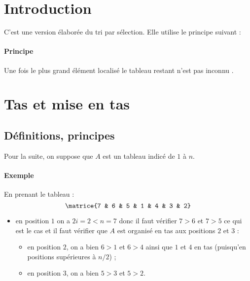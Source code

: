 \documentclass{mybourbaki}
\begin{document}
\section*{Introduction}
C'est une version élaborée du tri par sélection. Elle utilise le principe suivant :
\paragraph{Principe}Une fois le plus grand élément localisé le tableau restant n'est pas \og inconnu \fg{}.

\section{Tas et mise en tas}
\subsection{Définitions, principes}
 Pour la suite, on suppose que $A$ est un tableau indicé de $1$ à $n$.
 

\paragraph{Exemple}En prenant le tableau : \[ \matrice{7 & 6 & 5 & 1 & 4 & 3 & 2}\]
\begin{itemize}
\item en position $1$ on a $2i = 2 < n =7$ donc il faut vérifier $7 > 6$ et $7 >5$ ce qui est le cas et il faut vérifier que $A$ est organisé en tas aux positions $2$ et $3$ :
\begin{itemize}
\item en position $2$, on a bien $6 > 1$ et $6>4$ ainsi que $1$ et $4$ en tas (puisqu'en positions supérieures à $n/2$) ;
\item en position $3$, on a bien $5 > 3$ et $5 > 2$.
\end{itemize}
\end{itemize}
\end{document}
